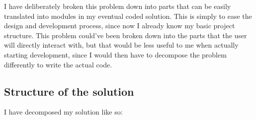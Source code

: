 \documentclass[../main.tex]{subfiles}
\begin{document}
I have deliberately broken this problem down into parts that can be easily translated into modules in my eventual coded solution. This is simply to ease the design and development process, since now I already know my basic project structure. This problem could've been broken down into the parts that the user will directly interact with, but that would be less useful to me when actually starting development, since I would then have to decompose the problem differently to write the actual code.

\subsection{Structure of the solution\label{design:structure-of-the-solution}}

I have decomposed my solution like so:
\end{document}
